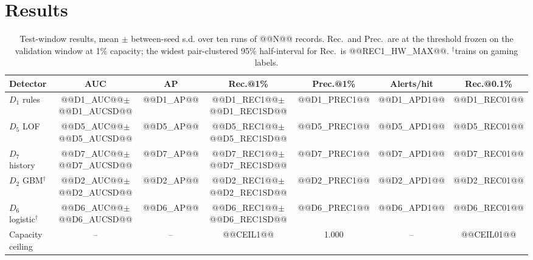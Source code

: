 \documentclass[conference]{IEEEtran}
\begin{document}
\section{Results}
\begin{table}[!t]
\caption{Test-window results, mean $\pm$ between-seed s.d. over ten runs of
@@N@@ records. Rec.\ and Prec.\ are at the threshold frozen on the validation
window at 1\% capacity; the widest pair-clustered 95\% half-interval for Rec.\
is @@REC1_HW_MAX@@. $^\dagger$trains on gaming labels.}
\label{tab:main}
\centering
\scriptsize
\setlength{\tabcolsep}{2pt}
\begin{tabular}{@{}lcccccc@{}}
\toprule
Detector & AUC & AP & Rec.@1\% & Prec.@1\% & Alerts/hit & Rec.@0.1\% \\
\midrule
$D_1$ rules & @@D1_AUC@@$\pm$@@D1_AUCSD@@ & @@D1_AP@@ & @@D1_REC1@@$\pm$@@D1_REC1SD@@ & @@D1_PREC1@@ & @@D1_APD1@@ & @@D1_REC01@@ \\
$D_5$ LOF & @@D5_AUC@@$\pm$@@D5_AUCSD@@ & @@D5_AP@@ & @@D5_REC1@@$\pm$@@D5_REC1SD@@ & @@D5_PREC1@@ & @@D5_APD1@@ & @@D5_REC01@@ \\
$D_7$ history & @@D7_AUC@@$\pm$@@D7_AUCSD@@ & @@D7_AP@@ & @@D7_REC1@@$\pm$@@D7_REC1SD@@ & @@D7_PREC1@@ & @@D7_APD1@@ & @@D7_REC01@@ \\
$D_2$ GBM$^\dagger$ & @@D2_AUC@@$\pm$@@D2_AUCSD@@ & @@D2_AP@@ & @@D2_REC1@@$\pm$@@D2_REC1SD@@ & @@D2_PREC1@@ & @@D2_APD1@@ & @@D2_REC01@@ \\
$D_6$ logistic$^\dagger$ & @@D6_AUC@@$\pm$@@D6_AUCSD@@ & @@D6_AP@@ & @@D6_REC1@@$\pm$@@D6_REC1SD@@ & @@D6_PREC1@@ & @@D6_APD1@@ & @@D6_REC01@@ \\
\midrule
Capacity ceiling & -- & -- & @@CEIL1@@ & 1.000 & -- & @@CEIL01@@ \\
\bottomrule
\end{tabular}
\end{table}
\end{document}
